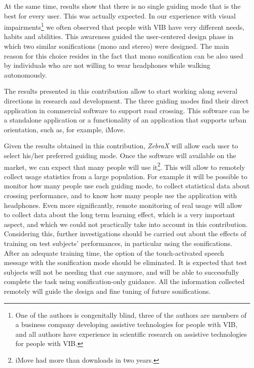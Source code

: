 \documentclass{article}
\newcommand{\zebra}{\emph{ZebraX}}
\begin{document}
At the same time, results show that there is no single guiding mode that is the best for every user.
This was actually expected. In our experience with visual impairments\footnote{One of the authors is congenitally blind, three of the authors are members of a business company developing assistive technologies for people with VIB, and all authors have experience in scientific research on assistive technologies for people with VIB.} we often observed that people with VIB have very different needs, habits and abilities.
This awareness guided the user-centered design phase in which two similar sonifications (mono and stereo) were designed. The main reason for this choice resides in the fact that mono sonification can be also used by individuals who are not willing to wear headphones while walking autonomously.

The results presented in this contribution allow to start working along several directions in research and development.
The three guiding modes find their direct application in commercial software to support road crossing. This software can be a standalone application or a functionality of an application that supports urban orientation, such as, for example, iMove. 

Given the results obtained in this contribution, \zebra{} will allow each user to select his/her preferred guiding mode.
Once the software will available on the market, we can expect that many people will use it\footnote{iMove had more than  downloads in two years.}. This will allow to remotely collect usage statistics from a large population. For example it will be possible to monitor how many people use each guiding mode, to collect statistical data about crossing performance, and to know how many people use the application with headphones.
Even more significantly, remote monitoring of real usage will allow to collect data about the long term learning effect, which is a very important aspect, and which we could not practically take into account in this contribution. 
Considering this, further investigations should be carried out about the effects of training on test subjects' performances, in particular using the sonifications. After an adequate training time, the option of the touch-activated speech message with the sonification mode should be eliminated. It is expected that test subjects will not be needing that cue anymore, and will be able to successfully complete the task using sonification-only guidance.
All the information collected remotely will guide the design and fine tuning of future sonifications.
\end{document}
